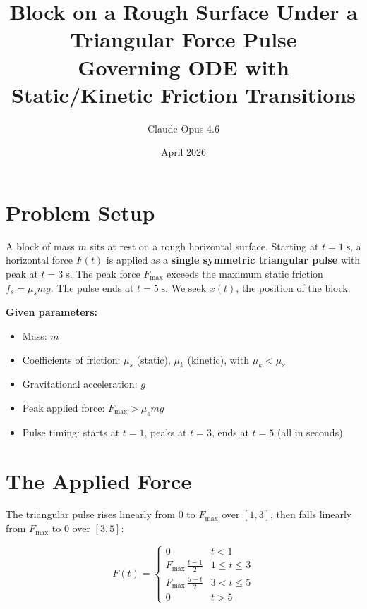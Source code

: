 \documentclass[11pt]{article}
\title{Block on a Rough Surface Under a Triangular Force Pulse\\[6pt]
\large Governing ODE with Static/Kinetic Friction Transitions}
\author{Claude Opus 4.6}
\date{April 2026}
\begin{document}
\maketitle

\section{Problem Setup}

\begin{tcolorbox}[colback=blue!5, colframe=blue!50!black, title=Physical System]
A block of mass $m$ sits at rest on a rough horizontal surface.  Starting at $t = 1\;\text{s}$, a horizontal force $F(t)$ is applied as a \textbf{single symmetric triangular pulse} with peak at $t = 3\;\text{s}$.  The peak force $F_{\max}$ exceeds the maximum static friction $f_s = \mu_s m g$.  The pulse ends at $t = 5\;\text{s}$.  We seek $x(t)$, the position of the block.
\end{tcolorbox}

\medskip
\noindent
\textbf{Given parameters:}
\begin{itemize}
    \item Mass: $m$
    \item Coefficients of friction: $\mu_s$ (static), $\mu_k$ (kinetic), with $\mu_k < \mu_s$
    \item Gravitational acceleration: $g$
    \item Peak applied force: $F_{\max} > \mu_s m g$
    \item Pulse timing: starts at $t = 1$, peaks at $t = 3$, ends at $t = 5$ (all in seconds)
\end{itemize}

\section{The Applied Force}

The triangular pulse rises linearly from $0$ to $F_{\max}$ over $[1, 3]$, then falls linearly from $F_{\max}$ to $0$ over $[3, 5]$:

\begin{equation}
\boxed{
F(t) =
\begin{cases}
0 & t < 1 \\[4pt]
\displaystyle F_{\max}\,\frac{t - 1}{2} & 1 \le t \le 3 \\[8pt]
\displaystyle F_{\max}\,\frac{5 - t}{2} & 3 < t \le 5 \\[4pt]
0 & t > 5
\end{cases}
}
\label{eq:Ft}
\end{equation}
\end{document}
